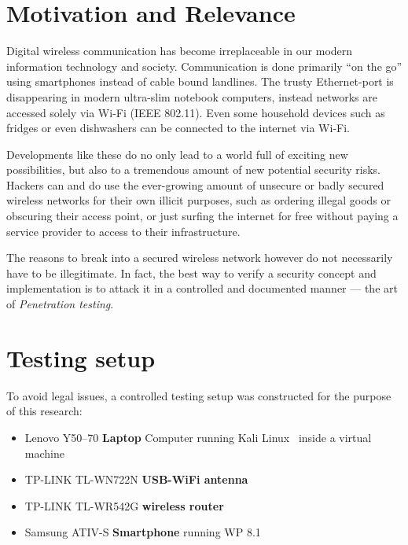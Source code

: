 \section{Motivation and Relevance}

Digital wireless communication has become irreplaceable in our modern information technology and society. Communication is done primarily “on the go” using smartphones instead of cable bound landlines. The trusty Ethernet-port is disappearing in modern ultra-slim notebook computers, instead networks are accessed solely via Wi-Fi (IEEE 802.11). Even some household devices such as fridges or even dishwashers can be connected to the internet via Wi-Fi.

Developments like these do no only lead to a world full of exciting new possibilities, but also to a tremendous amount of new potential security risks. Hackers can and do use the ever-growing amount of unsecure or badly secured wireless networks for their own illicit purposes, such as ordering illegal goods or obscuring their access point, or just surfing the internet for free without paying a service provider to access to their infrastructure.  

The reasons to break into a secured wireless network however do not necessarily have to be illegitimate. In fact, the best way to verify a security concept and implementation is to attack it in a controlled and documented manner --- the art of \emph{Penetration testing}.

\section{Testing setup}

To avoid legal issues, a controlled testing setup was constructed for the purpose of this research:

\begin{itemize}

\item{Lenovo Y50--70 \textbf{Laptop} Computer running Kali Linux~\cite{OffSec17} inside a virtual machine}

\item{TP-LINK TL-WN722N \textbf{USB-WiFi antenna}}

\item{TP-LINK TL-WR542G \textbf{wireless router}}

\item{Samsung ATIV-S \textbf{Smartphone} running WP 8.1}

\end{itemize}

